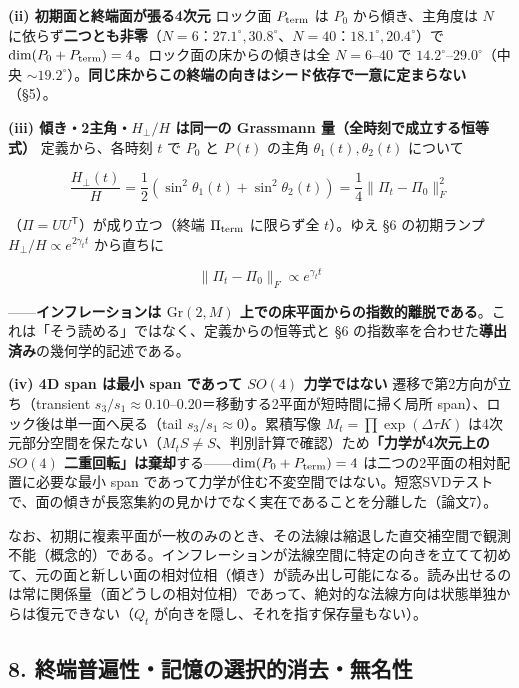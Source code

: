 \documentclass[
  a4paper,
]{ltjsarticle}
\begin{document}
\textbf{(ii) 初期面と終端面が張る4次元} ロック面 \(P_{\rm term}\) は
\(P_0\) から傾き、主角度は \(N\)
に依らず\textbf{二つとも非零}（\(N=6\)：\(27.1^\circ,30.8^\circ\)、\(N=40\)：\(18.1^\circ,20.4^\circ\)）で
\(\dim(P_0+P_{\rm term})=4\)。ロック面の床からの傾きは全 \(N=6\)--\(40\)
で \(14.2^\circ\)--\(29.0^\circ\)（中央
\(\sim19.2^\circ\)）。\textbf{同じ床からこの終端の向きはシード依存で一意に定まらない}（§5）。

\textbf{(iii) 傾き・2主角・\(H_\perp/H\) は同一の Grassmann
量（全時刻で成立する恒等式）} 定義から、各時刻 \(t\) で \(P_0\) と
\(P(t)\) の主角 \(\theta_1(t),\theta_2(t)\) について

\[\frac{H_\perp(t)}{H}=\frac12\left(\sin^2\theta_1(t)+\sin^2\theta_2(t)\right)=\frac14\big\|\Pi_t-\Pi_0\big\|_F^2\]

（\(\Pi=UU^{\mathsf T}\)）が成り立つ（終端 \(\Pi_{\rm term}\) に限らず全
\(t\)）。ゆえ §6 の初期ランプ \(H_\perp/H\propto e^{2\gamma_t t}\)
から直ちに

\[\boxed{\ \|\Pi_t-\Pi_0\|_F\propto e^{\gamma_t t}\ }\]

------\textbf{インフレーションは \(\mathrm{Gr}(2,M)\)
上での床平面からの指数的離脱である}。これは「そう読める」ではなく、定義からの恒等式と
§6 の指数率を合わせた\textbf{導出済み}の幾何学的記述である。

\textbf{(iv) 4D span は最小 span であって \(SO(4)\) 力学ではない}
遷移で第2方向が立ち（transient
\(s_3/s_1\approx0.10\)--\(0.20\)＝移動する2平面が短時間に掃く局所
span）、ロック後は単一面へ戻る（tail \(s_3/s_1\approx0\)）。累積写像
\(M_t=\prod\exp(\Delta\tau K)\)
は4次元部分空間を保たない（\(M_tS\neq S\)、判別計算で確認）ため\textbf{「力学が4次元上の
\(SO(4)\) 二重回転」は棄却}する------\(\dim(P_0+P_{\rm term})=4\)
は二つの2平面の相対配置に必要な最小 span
であって力学が住む不変空間ではない。短窓SVDテストで、面の傾きが長窓集約の見かけでなく実在であることを分離した（論文7）。

なお、初期に複素平面が一枚のみのとき、その法線は縮退した直交補空間で観測不能（概念的）である。インフレーションが法線空間に特定の向きを立てて初めて、元の面と新しい面の相対位相（傾き）が読み出し可能になる。読み出せるのは常に関係量（面どうしの相対位相）であって、絶対的な法線方向は状態単独からは復元できない（\(Q_t\)
が向きを隠し、それを指す保存量もない）。

\subsection{8.
終端普遍性・記憶の選択的消去・無名性}\label{ux7d42ux7aefux666eux904dux6027ux8a18ux61b6ux306eux9078ux629eux7684ux6d88ux53bbux7121ux540dux6027}
\end{document}
